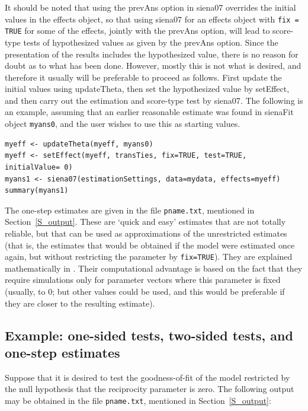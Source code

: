 \documentclass[a4paper,fleqn,11pt]{article}
\newcommand{\+}{\, + \,}
\newcommand{\sfn}[1]{\textsf{#1}}
\begin{document}
It should be noted that using the \sfn{prevAns} option in \sfn{siena07}
overrides the initial values in the effects object,
so that using \sfn{siena07} for an effects object with
\texttt{fix = TRUE} for some of the effects, jointly with
the \sfn{prevAns} option, will lead to score-type tests
of hypothesized values as given by the  \sfn{prevAns} option.
Since the presentation of the results includes the
hypothesized value, there is no reason for doubt as to what
has been done. However, mostly this is not what is desired,
and therefore it usually will be preferable to proceed as follows.
First update the initial values using \sfn{updateTheta}, then
set the hypothesized value by \sfn{setEffect}, and then
carry out the estimation and score-type test by \sfn{siena07}.
The following is an example, assuming that an earlier
reasonable estimate was found in \sfn{sienaFit} object \texttt{myans0},
and the user wishes to use this as starting values.
\begin{verbatim}
myeff <- updateTheta(myeff, myans0)
myeff <- setEffect(myeff, transTies, fix=TRUE, test=TRUE, initialValue= 0)
myans1 <- siena07(estimationSettings, data=mydata, effects=myeff)
summary(myans1)
\end{verbatim}


The one-step estimates are given in the file \texttt{pname.txt},
mentioned in Section~\ref{S_output}.
These are `quick and easy' estimates that are not totally
reliable, but that can be used as approximations of the unrestricted estimates
(that is, the estimates that would be obtained if the model were estimated
once again, but without restricting the parameter by \texttt{fix=TRUE}).
They are explained mathematically in \citet{Schweinberger12}.
Their computational advantage is based on the fact that they require simulations
only for parameter vectors where this parameter is fixed (usually, to 0;
but other values could be used, and this would be preferable if they are closer
to the resulting estimate).

\subsection{Example: one-sided tests, two-sided tests, and one-step estimates}
\label{example}

Suppose that it is desired to test the goodness-of-fit of the model
restricted by the null hypothesis that the reciprocity parameter is zero.
The following output may be obtained in the file \texttt{pname.txt},
mentioned in Section~\ref{S_output}:
\end{document}
